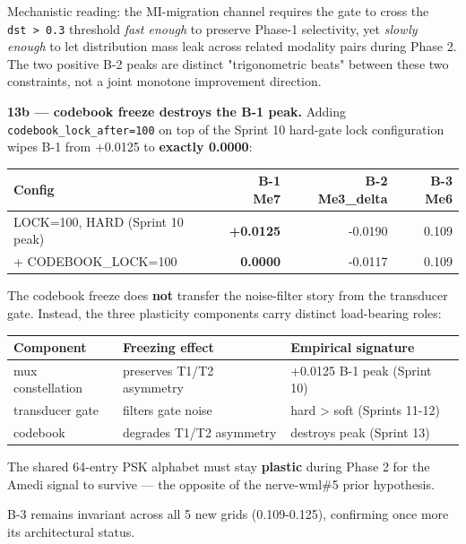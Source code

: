 \documentclass[
]{article}
\newcounter{none} %
\begin{document}
Mechanistic reading: the MI-migration channel requires the gate to cross
the \texttt{dst\ \textgreater{}\ 0.3} threshold \emph{fast enough} to
preserve Phase-1 selectivity, yet \emph{slowly enough} to let
distribution mass leak across related modality pairs during Phase 2. The
two positive B-2 peaks are distinct "trigonometric beats" between these
two constraints, not a joint monotone improvement direction.

\textbf{13b --- codebook freeze destroys the B-1 peak.} Adding
\texttt{codebook\_lock\_after=100} on top of the Sprint 10 hard-gate
lock configuration wipes B-1 from +0.0125 to \textbf{exactly 0.0000}:

{\def\LTcaptype{none} %
\begin{longtable}[]{@{}lrrr@{}}
\toprule\noalign{}
Config & B-1 Me7 & B-2 Me3\_delta & B-3 Me6 \\
\midrule\noalign{}
\endhead
\bottomrule\noalign{}
\endlastfoot
LOCK=100, HARD (Sprint 10 peak) & \textbf{+0.0125} & -0.0190 & 0.109 \\
+ CODEBOOK\_LOCK=100 & \textbf{0.0000} & -0.0117 & 0.109 \\
\end{longtable}
}

The codebook freeze does \textbf{not} transfer the noise-filter story
from the transducer gate. Instead, the three plasticity components carry
distinct load-bearing roles:

{\def\LTcaptype{none} %
\begin{longtable}[]{@{}lll@{}}
\toprule\noalign{}
Component & Freezing effect & Empirical signature \\
\midrule\noalign{}
\endhead
\bottomrule\noalign{}
\endlastfoot
mux constellation & preserves T1/T2 asymmetry & +0.0125 B-1 peak (Sprint
10) \\
transducer gate & filters gate noise & hard \textgreater{} soft (Sprints
11-12) \\
codebook & degrades T1/T2 asymmetry & destroys peak (Sprint 13) \\
\end{longtable}
}

The shared 64-entry PSK alphabet must stay \textbf{plastic} during Phase
2 for the Amedi signal to survive --- the opposite of the nerve-wml\#5
prior hypothesis.

B-3 remains invariant across all 5 new grids (0.109-0.125), confirming
once more its architectural status.
\end{document}
